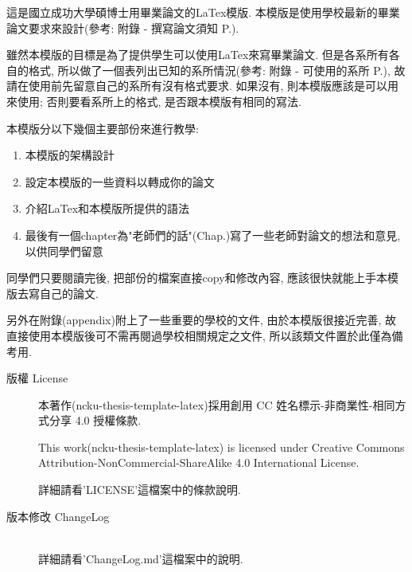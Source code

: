 
這是國立成功大學碩博士用畢業論文的LaTex模版. 本模版是使用學校最新的畢業論文要求來設計(參考: 附錄 - 撰寫論文須知 P.).

雖然本模版的目標是為了提供學生可以使用LaTex來寫畢業論文. 但是各系所有各自的格式, 所以做了一個表列出已知的系所情況(參考: 附錄 - 可使用的系所 P.), 故請在使用前先留意自己的系所有沒有格式要求. 如果沒有, 則本模版應該是可以用來使用; 否則要看系所上的格式, 是否跟本模版有相同的寫法.

本模版分以下幾個主要部份來進行教學:
\begin{enumerate}
  \item 本模版的架構設計
  \item 設定本模版的一些資料以轉成你的論文
  \item 介紹LaTex和本模版所提供的語法
  \item 最後有一個chapter為"老師們的話"(Chap.)寫了一些老師對論文的想法和意見, 以供同學們留意
\end{enumerate}
同學們只要閱讀完後, 把部份的檔案直接copy和修改內容, 應該很快就能上手本模版去寫自己的論文.

另外在附錄(appendix)附上了一些重要的學校的文件, 由於本模版很接近完善, 故直接使用本模版後可不需再閱過學校相關規定之文件, 所以該類文件置於此僅為備考用.

\newpage

\begin{description}
  \item[版權 License] \hfill

    本著作(ncku-thesis-template-latex)採用創用 CC 姓名標示-非商業性-相同方式分享 4.0 授權條款.

    This work(ncku-thesis-template-latex) is licensed under Creative Commons Attribution-NonCommercial-ShareAlike 4.0 International License.

  詳細請看'LICENSE'這檔案中的條款說明.

  \EmptyLine
  \item[版本修改 ChangeLog] \hfill\\
  詳細請看'ChangeLog.md'這檔案中的說明.
\end{description}

\EndChapter
